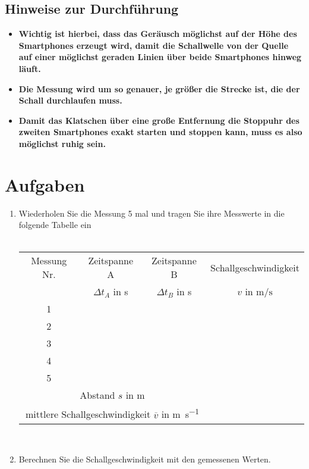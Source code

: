 \documentclass[12pt,oneside]{scrartcl}
\begin{document}
\subsection*{Hinweise zur Durchführung}
\begin{itemize}
\item \textbf{Wichtig ist hierbei, dass das Geräusch möglichst auf der Höhe des Smartphones erzeugt wird, damit die Schallwelle von der Quelle auf einer möglichst geraden Linien über beide Smartphones hinweg läuft.}
\item \textbf{Die Messung wird um so genauer, je größer die Strecke ist, die der Schall durchlaufen muss.}
\item \textbf{Damit das Klatschen über eine große Entfernung die Stoppuhr des zweiten Smartphones exakt starten und stoppen kann, muss es also möglichst ruhig sein.}
\end{itemize}
\section*{Aufgaben}
\begin{enumerate}
\item Wiederholen Sie die Messung 5 mal und tragen Sie ihre Messwerte in die folgende Tabelle ein\\\\
\vspace{0,5cm}
\begin{large}
\begin{tabular}{|c|c|c|c|}
\hline
Messung Nr. & Zeitspanne A  & Zeitspanne B & Schallgeschwindigkeit \\
 & $\Delta t_{A}$ in s &  $\Delta t_{B}$ in s & $v$ in $\si{\meter\per\second}$ \\ 
\hline 
1 &  &  & \\ 
\hline 
2 &  &  & \\ 
\hline 
3 &  &  & \\ 
\hline 
4 &  &  & \\ 
\hline 
5 &  &  & \\ 
\hline 
\hline
\multicolumn{3}{|c|}{Abstand $s$ in $\si{\meter}$} &  \\
\hline
\multicolumn{3}{|c|}{mittlere Schallgeschwindigkeit $\overline{v}$ in \si{\meter\per\second}} & \\
\hline
\end{tabular}\label{tab}\end{large} \\
\item Berechnen Sie die Schallgeschwindigkeit mit den gemessenen Werten.
\end{enumerate}
\end{document}

